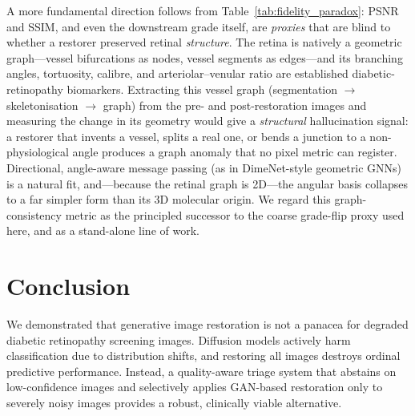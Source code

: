 \documentclass[conference]{IEEEtran}
\begin{document}
A more fundamental direction follows from Table~\ref{tab:fidelity_paradox}: PSNR and SSIM, and even the downstream grade itself, are \textit{proxies} that are blind to whether a restorer preserved retinal \textit{structure}. The retina is natively a geometric graph---vessel bifurcations as nodes, vessel segments as edges---and its branching angles, tortuosity, calibre, and arteriolar--venular ratio are established diabetic-retinopathy biomarkers. Extracting this vessel graph (segmentation $\rightarrow$ skeletonisation $\rightarrow$ graph) from the pre- and post-restoration images and measuring the change in its geometry would give a \textit{structural} hallucination signal: a restorer that invents a vessel, splits a real one, or bends a junction to a non-physiological angle produces a graph anomaly that no pixel metric can register. Directional, angle-aware message passing (as in DimeNet-style geometric GNNs) is a natural fit, and---because the retinal graph is 2D---the angular basis collapses to a far simpler form than its 3D molecular origin. We regard this graph-consistency metric as the principled successor to the coarse grade-flip proxy used here, and as a stand-alone line of work.

\section{Conclusion}
We demonstrated that generative image restoration is not a panacea for degraded diabetic retinopathy screening images. Diffusion models actively harm classification due to distribution shifts, and restoring all images destroys ordinal predictive performance. Instead, a quality-aware triage system that abstains on low-confidence images and selectively applies GAN-based restoration only to severely noisy images provides a robust, clinically viable alternative.



\end{document}
